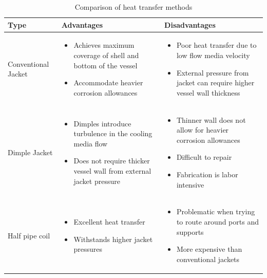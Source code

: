 \begin{table}[h]
\caption{Comparison of heat transfer methods \cite{myerson_handbook_2019} }
\label{tab:heatransfermethodstype}
\begin{tabularx}{\linewidth}{@{}lXX@{}}
\toprule
Type & Advantages                 & Disadvantages                               \\ \midrule
Conventional Jacket & \begin{itemize}[label=+,leftmargin=1em]
  \item Achieves maximum coverage of shell and bottom of the vessel
  \item Accommodate heavier corrosion allowances
\end{itemize} & \begin{itemize}[label=-,leftmargin=1em]
  \item Poor heat transfer due to low flow media velocity
  \item External pressure from jacket can require higher vessel wall thickness 
\end{itemize} \\\midrule 
Dimple Jacket & \begin{itemize}[label=+,leftmargin=1em]
  \item Dimples introduce turbulence in the cooling media flow
  \item Does not require thicker vessel wall from external jacket pressure
\end{itemize} & \begin{itemize}[label=-,leftmargin=1em]
  \item Thinner wall does not allow for heavier corrosion allowances
  \item Difficult to repair
  \item Fabrication is labor intensive
\end{itemize} \\\midrule
Half pipe coil  &  \begin{itemize}[label=+,leftmargin=1em]
  \item Excellent heat transfer
  \item Withstands higher jacket pressures
\end{itemize} & \begin{itemize}[label=-,leftmargin=1em]
  \item Problematic when trying to route around ports and supports 
  \item More expensive than conventional jackets

\end{itemize}
\\\bottomrule
\end{tabularx}
\end{table}

